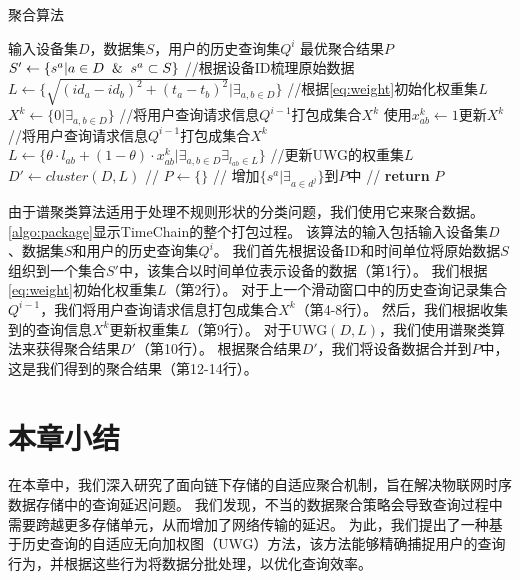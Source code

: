 \begin{algorithm}[t]
	\caption{聚合算法}
	\label{algo:package}
    \begin{algorithmic}[1]
        \REQUIRE 输入设备集$D$，数据集$S$，用户的历史查询集$Q^i$
        \ENSURE 最优聚合结果$P$
        \STATE $S' \gets \{s^a | a \in D \And s^a \subset S\}$ //根据设备ID梳理原始数据
        \STATE $L \gets \Big\{ \sqrt{ (id_a - id_b)^2 + (t_a - t_b)^2 } \Big| \exists_{a,b \in D} \Big\}$ //根据\autoref{eq:weight}初始化权重集$L$
        \STATE $X^k \gets \{0 | \exists_{a,b \in D} \}$ //将用户查询请求信息$Q^{i-1}$打包成集合$X^k$
                \STATE \textnormal{使用$x^k_{ab} \gets 1 $更新$X^k$} //将用户查询请求信息$Q^{i-1}$打包成集合$X^k$
            \ENDIF
        \ENDFOR
        \STATE $L \gets \Big\{ \theta \cdot l_{ab} + (1 - \theta) \cdot x_{ab}^k \Big| \exists_{a,b \in D} \exists_{l_{ab} \in L} \Big\}$ //更新UWG的权重集$L$
        \STATE $D' \gets \textit{cluster}(D, L)$ //
        \STATE $P \gets \{\}$ //
            \STATE \textnormal{增加$\{ s^a | \exists_{a \in d^j} \}$到$P$中} //
        \ENDFOR
        \STATE \textbf{return} $P$
    \end{algorithmic}
\end{algorithm}

由于谱聚类算法适用于处理不规则形状的分类问题，我们使用它来聚合数据。
\ref{algo:package}显示TimeChain的整个打包过程。
该算法的输入包括输入设备集$D$、数据集$S$和用户的历史查询集$Q^i$。
我们首先根据设备ID和时间单位将原始数据$S$组织到一个集合$S'$中，该集合以时间单位表示设备的数据（第1行）。
我们根据\autoref{eq:weight}初始化权重集$L$（第2行）。
对于上一个滑动窗口中的历史查询记录集合$Q^{i-1}$，我们将用户查询请求信息打包成集合$X^k$（第4-8行）。
然后，我们根据收集到的查询信息$X^k$更新权重集$L$（第9行）。
对于UWG$(D,L)$，我们使用谱聚类算法来获得聚合结果$D'$（第10行）。
根据聚合结果$D'$，我们将设备数据合并到$P$中，这是我们得到的聚合结果（第12-14行）。

\section{本章小结}
在本章中，我们深入研究了面向链下存储的自适应聚合机制，旨在解决物联网时序数据存储中的查询延迟问题。
我们发现，不当的数据聚合策略会导致查询过程中需要跨越更多存储单元，从而增加了网络传输的延迟。
为此，我们提出了一种基于历史查询的自适应无向加权图（UWG）方法，该方法能够精确捕捉用户的查询行为，并根据这些行为将数据分批处理，以优化查询效率。

